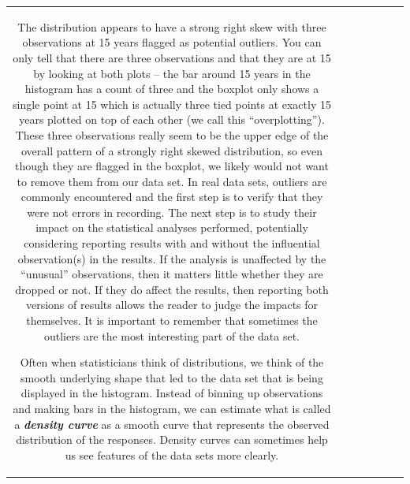 \documentclass[]{book}
\theoremstyle{definition}
\theoremstyle{definition}
\theoremstyle{remark}
\begin{document}
\begin{longtable}[]{@{}ccccccc@{}}
\begin{minipage}[b]{0.10\columnwidth}
The distribution appears to have a strong right skew with three
observations at 15 years flagged as potential outliers. You can only
tell that there are three observations and that they are at 15 by
looking at both plots -- the bar around 15 years in the histogram has a
count of three and the boxplot only shows a single point at 15 which is
actually three tied points at exactly 15 years plotted on top of each
other (we call this ``overplotting''). These three observations really
seem to be the upper edge of the overall pattern of a strongly right
skewed distribution, so even though they are flagged in the boxplot, we
likely would not want to remove them from our data set. In real data
sets, outliers are commonly encountered and the first step is to verify
that they were not errors in recording. The next step is to study their
impact on the statistical analyses performed, potentially considering
reporting results with and without the influential observation(s) in the
results. If the analysis is unaffected by the ``unusual'' observations,
then it matters little whether they are dropped or not. If they do
affect the results, then reporting both versions of results allows the
reader to judge the impacts for themselves. It is important to remember
that sometimes the outliers are the most interesting part of the data
set.

Often when statisticians think of distributions, we think of the smooth
underlying shape that led to the data set that is being displayed in the
histogram. Instead of binning up observations and making bars in the
histogram, we can estimate what is called a \textbf{\emph{density curve
}} as a smooth curve that represents the observed distribution of the
responses. Density curves can sometimes help us see features of the data
sets more clearly.


\end{minipage}
\end{longtable}
\end{document}
